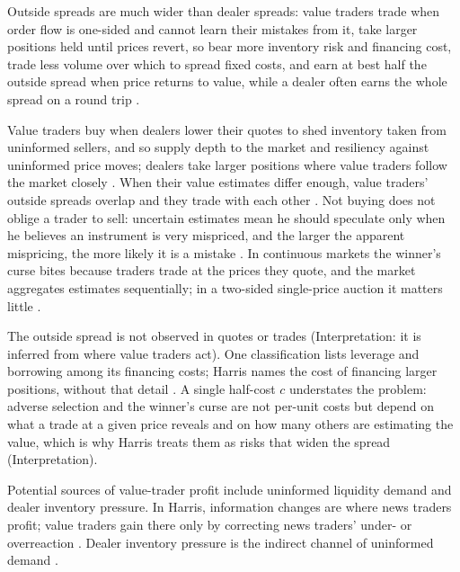 \begin{qfdefinition}
Outside spreads are much wider than dealer spreads: value traders trade when order flow is one-sided and cannot learn their mistakes from it, take larger positions held until prices revert, so bear more inventory risk and financing cost, trade less volume over which to spread fixed costs, and earn at best half the outside spread when price returns to value, while a dealer often earns the whole spread on a round trip \citep[same chap., sec.~16.3, pp.~344--345]{alpha-harris}.

 Value traders buy when dealers lower their quotes to shed inventory taken from uninformed sellers, and so supply depth to the market and resiliency against uninformed price moves; dealers take larger positions where value traders follow the market closely \citep[same chap., pp.~340, 345--346]{alpha-harris}. When their value estimates differ enough, value traders' outside spreads overlap and they trade with each other \citep[same chap., p.~343]{alpha-harris}. Not buying does not oblige a trader to sell: uncertain estimates mean he should speculate only when he believes an instrument is very mispriced, and the larger the apparent mispricing, the more likely it is a mistake \citep[same chap., box, p.~343]{alpha-harris}. In continuous markets the winner's curse bites because traders trade at the prices they quote, and the market aggregates estimates sequentially; in a two-sided single-price auction it matters little \citep[same chap., pp.~342--343]{alpha-harris}.

 The outside spread is not observed in quotes or trades (Interpretation: it is inferred from where value traders act). One classification lists leverage and borrowing among its financing costs; Harris names the cost of financing larger positions, without that detail \citep[same chap., p.~344]{alpha-harris}. A single half-cost $c$ understates the problem: adverse selection and the winner's curse are not per-unit costs but depend on what a trade at a given price reveals and on how many others are estimating the value, which is why Harris treats them as risks that widen the spread (Interpretation).

Potential sources of value-trader profit include uninformed liquidity demand and dealer inventory pressure. In Harris, information changes are where news traders profit; value traders gain there only by correcting news traders' under- or overreaction \citep[chap.~``Informed Traders and Market Efficiency'', Table~10-1, p.~230, and p.~239]{alpha-harris}. Dealer inventory pressure is the indirect channel of uninformed demand \citep[chap.~``Value Traders'', pp.~339--340]{alpha-harris}.


\end{qfdefinition}
